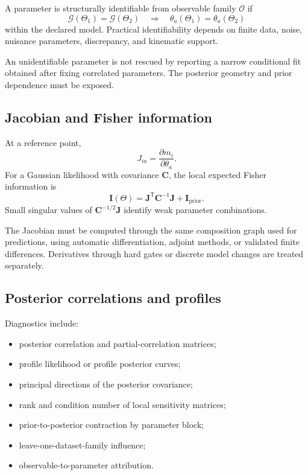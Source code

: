 \documentclass[11pt]{article}
\newcommand{\cO}{\mathcal O}
\newcommand{\cG}{\mathcal G}
\newcommand{\trans}{^{\mathsf T}}
\begin{document}
A parameter is structurally identifiable from observable family \(\cO\) if
\begin{equation}
 \cG(\Theta_1)=\cG(\Theta_2)
 \quad\Longrightarrow\quad
 \theta_a(\Theta_1)=\theta_a(\Theta_2)
 \label{eq:structural-identifiability}
\end{equation}
within the declared model.  Practical identifiability depends on finite data,
noise, nuisance parameters, discrepancy, and kinematic support.

An unidentifiable parameter is not rescued by reporting a narrow conditional
fit obtained after fixing correlated parameters.  The posterior geometry and
prior dependence must be exposed.

\subsection{Jacobian and Fisher information}

At a reference point,
\begin{equation}
 J_{ia}
 =
 \frac{\partial m_i}{\partial\theta_a}.
 \label{eq:sensitivity-jacobian}
\end{equation}
For a Gaussian likelihood with covariance \(\bm C\), the local expected Fisher
information is
\begin{equation}
 \bm I(\Theta)
 =
 \bm J\trans\bm C^{-1}\bm J
 +
 \bm I_{\mathrm{prior}}.
 \label{eq:fisher-information}
\end{equation}
Small singular values of
\(\bm C^{-1/2}\bm J\) identify weak parameter combinations.

The Jacobian must be computed through the same composition graph used for
predictions, using automatic differentiation, adjoint methods, or validated
finite differences.  Derivatives through hard gates or discrete model changes
are treated separately.

\subsection{Posterior correlations and profiles}

Diagnostics include:
\begin{itemize}
\item posterior correlation and partial-correlation matrices;
\item profile likelihood or profile posterior curves;
\item principal directions of the posterior covariance;
\item rank and condition number of local sensitivity matrices;
\item prior-to-posterior contraction by parameter block;
\item leave-one-dataset-family influence;
\item observable-to-parameter attribution.
\end{itemize}
\end{document}
